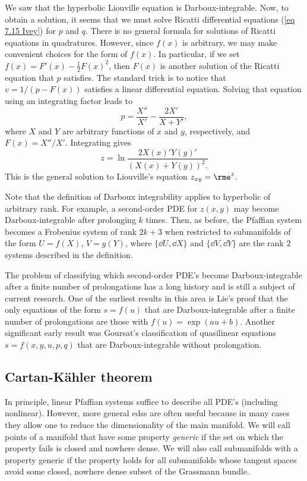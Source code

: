 \begin{example}
    We saw that the hyperbolic Liouville equation is Darboux-integrable. Now, to obtain a solution, it seems that we must solve Ricatti differential equations (\ref{eq 7.15 Ivey}) for $p$ and $q$. There is no general formula for solutions of Ricatti equations in quadratures. However, since $f(x)$ is arbitrary, we may make convenient choices for the form of $f(x)$. In particular, if we set $f(x)=F'(x)-\frac12 F(x)^2$, then $F(x)$ is another solution of the Ricatti equation that $p$ satisfies. The standard trick is to notice that $v=1/(p-F(x))$ satisfies a linear differential equation. Solving that equation using an integrating factor leads to 
    \[p=\frac{X''}{X'}-\frac{2X'}{X+Y'},\]
    where $X$ and $Y$ are arbitrary functions of $x$ and $y$, respectively, and $F(x)=X''/X'$. Integrating gives 
    \[z=\ln \frac{2X(x)'Y(y)'}{(X(x)+Y(y))^2.}\label{eq Liouville general solution}\]
    This is the general solution to Liouville's equation $z_{xy}=\rme^z$.
\end{example}

Note that the definition of Darboux integrability applies to hyperbolic of arbitrary rank. For example, a second-order PDE for $z(x,y)$ may become Darboux-integrable after prolonging $k$ times. Then, as before, the Pfaffian system becomes a Frobenius system of rank $2k+3$ when restricted to submanifolds of the form $U=f(X)$, $V=g(Y)$, where $\{\dd U,\dd X\}$ and $\{\dd V,\dd Y\}$ are the rank $2$ systems described in the definition. 

The problem of classifying which second-order PDE's become Darboux-integrable after a finite number of prolongations has a long history and is still a subject of current research. One of the earliest results in this area is Lie's proof that the only equations of the form $s=f(u)$ that are Darboux-integrable after a finite number of prolongations are those with $f(u)=\exp(au+b)$. Another significant early result was Goursat's classification of quasilinear equations $s=f(x,y,u,p,q)$ that are Darboux-integrable without prolongation. 





\subsection{Cartan-K\"ahler theorem}


In principle, linear Pfaffian systems suffice to describe all PDE's (including nonlinear). However, more general \glspl{eds} are often useful because in many cases they allow one to reduce the dimensionality of the main manifold. We will call points of a manifold that have some property \emph{generic} if the set on which the property fails is closed and nowhere dense. We will also call submanifolds with a property generic if the property holds for all submanifolds whose tangent spaces avoid some closed, nowhere dense subset of the Grassmann bundle.

